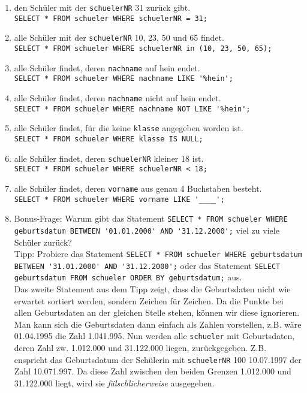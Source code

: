 \begin{Answer}[ref=Where]
	\begin{enumerate}
		\item den Schüler mit der \lstinline!schuelerNR! 31 zurück gibt.\\
		\lstinline!SELECT * FROM schueler WHERE schuelerNR = 31;!
		\item alle Schüler mit der \lstinline!schuelerNR! 10, 23, 50 und 65 findet.\\
		\lstinline!SELECT * FROM schueler WHERE schuelerNR in (10, 23, 50, 65);!
		\item alle Schüler findet, deren \lstinline!nachname! auf hein endet.\\
		\lstinline!SELECT * FROM schueler WHERE nachname LIKE '%hein';!
		\item alle Schüler findet, deren \lstinline!nachname! nicht auf hein endet.\\
		\lstinline!SELECT * FROM schueler WHERE nachname NOT LIKE '%hein';!
		\item alle Schüler findet, für die keine \lstinline!klasse! angegeben worden ist.\\
		\lstinline!SELECT * FROM schueler WHERE klasse IS NULL;!\\
		\item alle Schüler findet, deren \lstinline!schuelerNR! kleiner 18 ist.\\
		\lstinline!SELECT * FROM schueler WHERE schuelerNR < 18;!
		\item alle Schüler findet, deren \lstinline!vorname! aus genau 4 Buchstaben besteht.\\
		\lstinline!SELECT * FROM schueler WHERE vorname LIKE '____';!
		\item Bonus-Frage: Warum gibt das Statement \lstinline!SELECT * FROM schueler WHERE geburtsdatum BETWEEN '01.01.2000' AND '31.12.2000';! viel zu viele Schüler zurück?\\
		Tipp: Probiere das Statement \lstinline!SELECT * FROM schueler WHERE geburtsdatum BETWEEN '31.01.2000' AND '31.12.2000';! oder das Statement \lstinline!SELECT geburtsdatum FROM schueler ORDER BY geburtsdatum;! aus.\\
		Das zweite Statement aus dem Tipp zeigt, dass die Geburtsdaten nicht wie erwartet sortiert werden, sondern Zeichen für Zeichen. Da die Punkte bei allen Geburtsdaten an der gleichen Stelle stehen, können wir diese ignorieren. Man kann sich die Geburtsdaten dann einfach als Zahlen vorstellen, z.B. wäre 01.04.1995 die Zahl 1.041.995. Nun werden alle \lstinline!schueler! mit Geburtsdaten, deren Zahl zw. 1.012.000 und 31.122.000 liegen, zurückgegeben. Z.B. enspricht das Geburtsdatum der Schülerin mit \lstinline!schuelerNR! 100 10.07.1997 der Zahl 10.071.997. Da diese Zahl zwischen den beiden Grenzen 1.012.000 und 31.122.000 liegt, wird sie \textit{fälschlicherweise} ausgegeben.
	\end{enumerate}
\end{Answer}